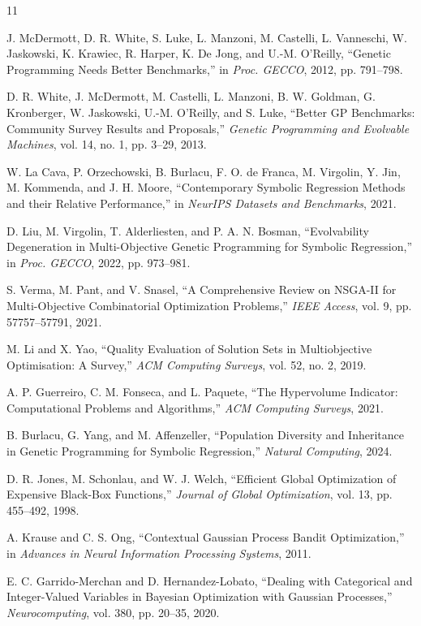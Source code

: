 \documentclass[a4paper,10pt,twocolumn]{ltjsarticle}
\begin{document}
\begin{thebibliography}{11}

J. McDermott, D. R. White, S. Luke, L. Manzoni, M. Castelli,
L. Vanneschi, W. Jaskowski, K. Krawiec, R. Harper, K. De Jong,
and U.-M. O'Reilly,
``Genetic Programming Needs Better Benchmarks,''
in \emph{Proc. GECCO}, 2012, pp. 791--798.

D. R. White, J. McDermott, M. Castelli, L. Manzoni,
B. W. Goldman, G. Kronberger, W. Jaskowski, U.-M. O'Reilly, and S. Luke,
``Better GP Benchmarks: Community Survey Results and Proposals,''
\emph{Genetic Programming and Evolvable Machines}, vol. 14, no. 1,
pp. 3--29, 2013.

W. La Cava, P. Orzechowski, B. Burlacu, F. O. de Franca,
M. Virgolin, Y. Jin, M. Kommenda, and J. H. Moore,
``Contemporary Symbolic Regression Methods and their Relative Performance,''
in \emph{NeurIPS Datasets and Benchmarks}, 2021.

D. Liu, M. Virgolin, T. Alderliesten, and P. A. N. Bosman,
``Evolvability Degeneration in Multi-Objective Genetic Programming for Symbolic Regression,''
in \emph{Proc. GECCO}, 2022, pp. 973--981.

S. Verma, M. Pant, and V. Snasel,
``A Comprehensive Review on NSGA-II for Multi-Objective Combinatorial Optimization Problems,''
\emph{IEEE Access}, vol. 9, pp. 57757--57791, 2021.

M. Li and X. Yao,
``Quality Evaluation of Solution Sets in Multiobjective Optimisation: A Survey,''
\emph{ACM Computing Surveys}, vol. 52, no. 2, 2019.

A. P. Guerreiro, C. M. Fonseca, and L. Paquete,
``The Hypervolume Indicator: Computational Problems and Algorithms,''
\emph{ACM Computing Surveys}, 2021.

B. Burlacu, G. Yang, and M. Affenzeller,
``Population Diversity and Inheritance in Genetic Programming for Symbolic Regression,''
\emph{Natural Computing}, 2024.

D. R. Jones, M. Schonlau, and W. J. Welch,
``Efficient Global Optimization of Expensive Black-Box Functions,''
\emph{Journal of Global Optimization}, vol. 13, pp. 455--492, 1998.

A. Krause and C. S. Ong,
``Contextual Gaussian Process Bandit Optimization,''
in \emph{Advances in Neural Information Processing Systems}, 2011.

E. C. Garrido-Merchan and D. Hernandez-Lobato,
``Dealing with Categorical and Integer-Valued Variables in Bayesian Optimization with Gaussian Processes,''
\emph{Neurocomputing}, vol. 380, pp. 20--35, 2020.

\end{thebibliography}
\end{document}

